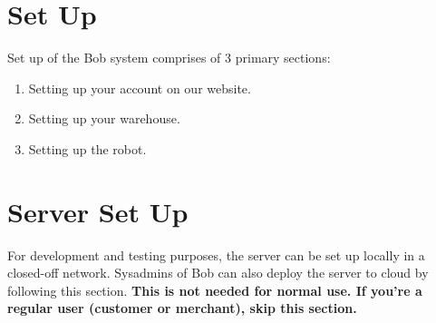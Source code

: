 \documentclass[onecolumn]{IEEEtran}
\begin{document}
\section{Set Up}
Set up of the Bob system comprises of 3 primary sections:
\begin{enumerate}
    \item Setting up your account on our website.
    \item Setting up your warehouse.
    \item Setting up the robot. 
\end{enumerate}


\section{Server Set Up}
For development and testing purposes, the server can be set up locally in a closed-off network. Sysadmins of Bob can also deploy the server to cloud by following this section. \textbf{This is not needed for normal use. If you're a regular user (customer or merchant), skip this section.}
\end{document}
